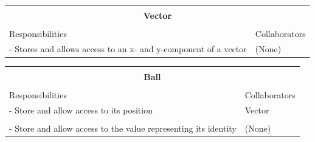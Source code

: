 \documentclass[titlepage]{article}
\begin{document}
\begin{table}[!htbp]
\centering
\begin{tabular}{| p{} | p{} |}\hline
	\multicolumn{2}{|l|}{}\\
	\multicolumn{2}{|c|}{\large{\textbf{Vector}}}\\
	\multicolumn{2}{|l|}{}\\\hline
	\vspace{0mm}\large{Responsibilities}\vspace{2mm} &\vspace{0mm}\large{Collaborators}\vspace{2mm}\\\hline
	\vspace{0mm}- Stores and allows access to an x- and y-component of a vector	&\vspace{0mm}(None)\\\hline
\end{tabular}
\end{table}
\newpage

\begin{table}[!htbp]
\centering
\begin{tabular}{| p{} | p{} |}\hline
	\multicolumn{2}{|l|}{}\\
	\multicolumn{2}{|c|}{\large{\textbf{Ball}}}\\
	\multicolumn{2}{|l|}{}\\\hline
	\vspace{0mm}\large{Responsibilities}\vspace{2mm} &\vspace{0mm}\large{Collaborators}\vspace{2mm}\\\hline
	\vspace{0mm}- Store and allow access to its position							&\vspace{0mm}Vector\\&\\
	- Store and allow access to the value representing its identity\vspace{2mm}		&(None)\vspace{2mm}\\\hline
\end{tabular}
\end{table}
\end{document}
